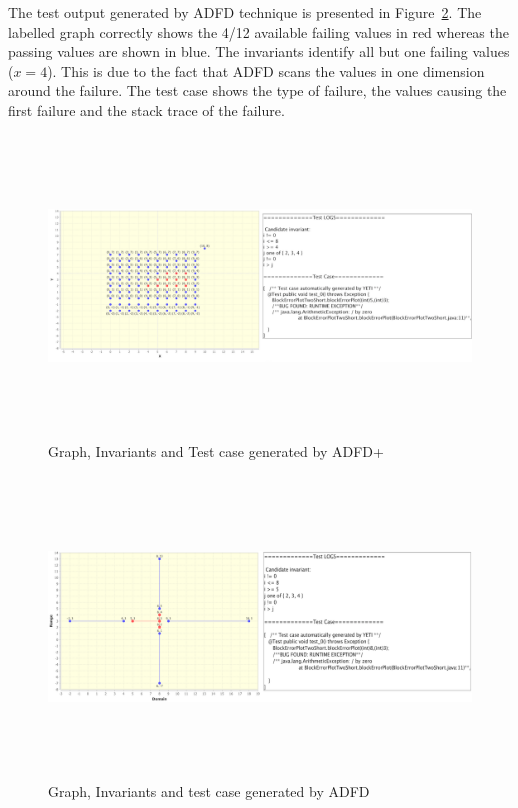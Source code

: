 The test output generated by ADFD technique is presented in Figure~\ref{fig:ADFD}. The labelled graph correctly shows the 4/12 available failing values in red whereas the passing values are shown in blue. The invariants identify all but one failing values ($x = 4$). This is due to the fact that ADFD scans the values in one dimension around the failure. The test case shows the type of failure, the values causing the first failure and the stack trace of the failure. 


\bigskip
\begin{figure}[H]
\centering
\includegraphics[width= 15.5cm,height=8cm]{chapter7/adfdPlusCombined.png}
\caption{Graph, Invariants and Test case generated by ADFD+}
\label{fig:ADFD+}
\end{figure}
\bigskip



\begin{figure}[H]
\centering
\includegraphics[width= 15.5cm,height=8cm]{chapter7/adfdCombined.png}
\caption{Graph, Invariants and test case generated by ADFD}
\label{fig:ADFD}
\end{figure}

